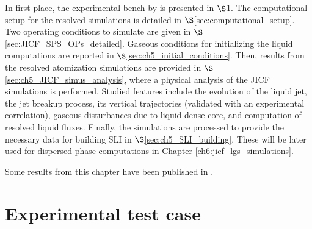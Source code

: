 In first place, the experimental bench by  is presented in $\S$\ref{sec:ch5_experimental_bench}. The computational setup for the resolved simulations is detailed in $\S$\ref{sec:computational_setup}. Two operating conditions to simulate are given in $\S$\ref{sec:JICF_SPS_OPs_detailed}. Gaseous conditions for initializing the liquid computations are reported in $\S$\ref{sec:ch5_initial_conditions}. Then, results from the resolved atomization simulations are provided in $\S$\ref{sec:ch5_JICF_simus_analysis}, where a physical analysis of the JICF simulations is performed. Studied features include the evolution of the liquid jet, the jet breakup process, its vertical trajectories (validated with an experimental correlation), gaseous disturbances due to liquid dense core, and computation of resolved liquid fluxes. Finally, the simulations are processed to provide the necessary data for building SLI in $\S$\ref{sec:ch5_SLI_building}. These will be later used for dispersed-phase computations in Chapter \ref{ch6:jicf_lgs_simulations}.

Some results from this chapter have been published in .








\section{Experimental test case}
	\label{sec:ch5_experimental_bench}

